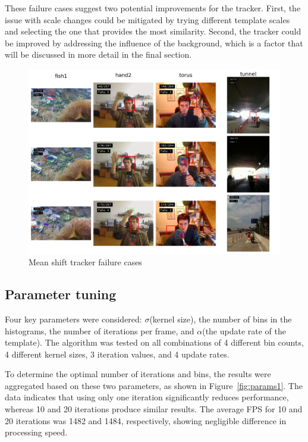 \documentclass[9pt]{IEEEtran}
\begin{document}
  These failure cases suggest two potential improvements for the tracker. 
  First, the issue with scale changes could be mitigated by trying different
   template scales and selecting the one that provides the most similarity.
    Second, the tracker could be improved by addressing the influence of the 
    background, which is a factor that will be discussed in more detail in the
     final section.

  \begin{figure}[h]
    \centering
    \includegraphics[width=0.99\columnwidth]{figures/failures.png}
    \caption{Mean shift tracker failure cases}
    \label{fig:failures}
  \end{figure}

\subsection{Parameter tuning}
Four key parameters were considered: $\sigma$(kernel size), the number of bins in 
the histograms, the number of iterations per frame, and $\alpha$(the update rate of the template).
 The algorithm was tested on all combinations of 4 different bin counts, 4 different 
 kernel sizes, 3 iteration values, and 4 update rates.

To determine the optimal number of iterations and bins, the results were aggregated 
based on these two parameters, as shown in Figure~\ref{fig:params1}. The data indicates 
that using only one iteration significantly reduces performance, whereas 10 and 20
 iterations produce similar results. The average FPS for 10 and 20 iterations was 1482 
 and 1484, respectively, showing negligible difference in processing speed.
\end{document}
